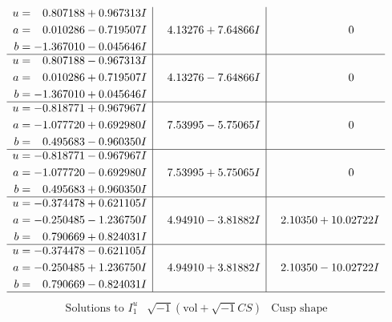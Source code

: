 \documentclass[1p]{elsarticle_modified}
\theoremstyle{definition}
\newcommand{\I}{\sqrt{-1}}
\begin{document}
$$\begin{array}{c|c|c}
\begin{aligned}
u &= \phantom{-}0.807188 + 0.967313 I \\
a &= \phantom{-}0.010286 - 0.719507 I \\
b &= -1.367010 - 0.045646 I\end{aligned}
 & \phantom{-}4.13276 + 7.64866 I & \phantom{-0.000000 } 0 \\ \hline\begin{aligned}
u &= \phantom{-}0.807188 - 0.967313 I \\
a &= \phantom{-}0.010286 + 0.719507 I \\
b &= -1.367010 + 0.045646 I\end{aligned}
 & \phantom{-}4.13276 - 7.64866 I & \phantom{-0.000000 } 0 \\ \hline\begin{aligned}
u &= -0.818771 + 0.967967 I \\
a &= -1.077720 + 0.692980 I \\
b &= \phantom{-}0.495683 - 0.960350 I\end{aligned}
 & \phantom{-}7.53995 - 5.75065 I & \phantom{-0.000000 } 0 \\ \hline\begin{aligned}
u &= -0.818771 - 0.967967 I \\
a &= -1.077720 - 0.692980 I \\
b &= \phantom{-}0.495683 + 0.960350 I\end{aligned}
 & \phantom{-}7.53995 + 5.75065 I & \phantom{-0.000000 } 0 \\ \hline\begin{aligned}
u &= -0.374478 + 0.621105 I \\
a &= -0.250485 - 1.236750 I \\
b &= \phantom{-}0.790669 + 0.824031 I\end{aligned}
 & \phantom{-}4.94910 - 3.81882 I & \phantom{-}2.10350 + 10.02722 I \\ \hline\begin{aligned}
u &= -0.374478 - 0.621105 I \\
a &= -0.250485 + 1.236750 I \\
b &= \phantom{-}0.790669 - 0.824031 I\end{aligned}
 & \phantom{-}4.94910 + 3.81882 I & \phantom{-}2.10350 - 10.02722 I\\
 \hline 
 \end{array}$$\newpage$$\begin{array}{c|c|c}  
\text{Solutions to }I^u_{1}& \I (\text{vol} + \sqrt{-1}CS) & \text{Cusp shape}\\

\end{array}$$
\end{document}
